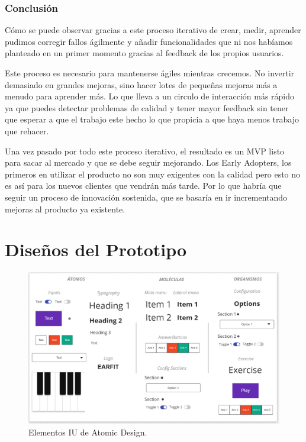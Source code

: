 \documentclass[12pt,twoside,titlepage]{report}
\begin{document}
\subsection{Conclusión} 

Cómo se puede observar gracias a este proceso iterativo de crear, medir, aprender pudimos corregir fallos ágilmente y añadir funcionalidades que ni nos habíamos planteado en un primer momento gracias al feedback de los propios usuarios.

Este proceso es necesario para mantenerse ágiles mientras crecemos. No invertir demasiado en grandes mejoras, sino hacer lotes de pequeñas mejoras más a menudo para aprender más. Lo que lleva a un circulo de interacción más rápido ya que puedes detectar problemas de calidad y tener mayor feedback sin tener que esperar a que el trabajo este hecho lo que propicia a que haya menos trabajo que rehacer.

Una vez pasado por todo este proceso iterativo, el resultado es un MVP listo para sacar al mercado y que se debe seguir mejorando. 
Los Early Adopters, los primeros en utilizar el producto no son muy exigentes con la calidad pero esto no es así para los nuevos clientes que vendrán más tarde. 
Por lo que habría que seguir un proceso de innovación sostenida, que se basaría en ir incrementando mejoras al producto ya existente.

\chapter{Diseños del Prototipo}

\label{sec:Prototipos}
\begin{figure}[H]
    \centering
    \includegraphics[scale=0.5]{Design Thinking/Prototipo/AtomicDesign}
    \caption{Elementos IU de Atomic Design.}
    \label{fig:AtomicDesign}
\end{figure}
\end{document}
